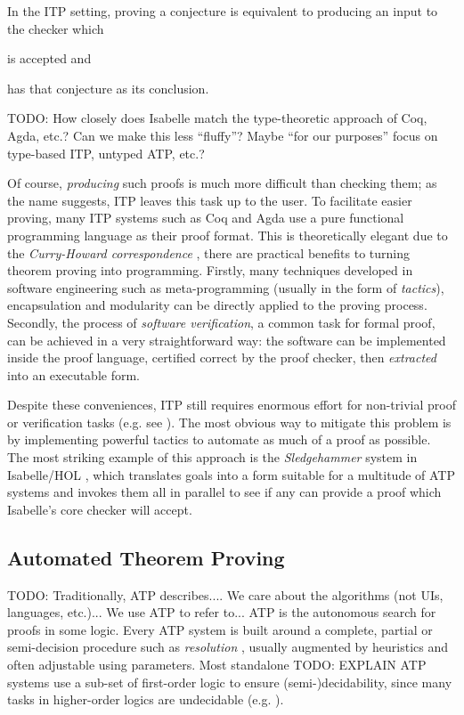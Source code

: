 \documentclass[]{article}
\begin{document}
In the ITP setting, proving a conjecture is equivalent to producing an input to the checker which \begin{inparaenum}[a)]
  \item is accepted and
  \item has that conjecture as its conclusion.
\end{inparaenum}

TODO: How closely does Isabelle match the type-theoretic approach of Coq, Agda, etc.? Can we make this less ``fluffy''?
      Maybe ``for our purposes'' focus on type-based ITP, untyped ATP, etc.?

Of course, \emph{producing} such proofs is much more difficult than checking them; as the name suggests, ITP leaves this task up to the user. To facilitate easier proving, many ITP systems such as Coq and Agda use a pure functional programming language as their proof format. This is theoretically elegant due to the \emph{Curry-Howard correspondence} \cite{wadler2015propositions}, there are practical benefits to turning theorem proving into programming. Firstly, many techniques developed in software engineering such as meta-programming (usually in the form of \emph{tactics}), encapsulation and modularity can be directly applied to the proving process. Secondly, the process of \emph{software verification}, a common task for formal proof, can be achieved in a very straightforward way: the software can be implemented inside the proof language, certified correct by the proof checker, then \emph{extracted} into an executable form.

Despite these conveniences, ITP still requires enormous effort for non-trivial proof or verification tasks (e.g. see \cite{hales2015formal}). The most obvious way to mitigate this problem is by implementing powerful tactics to automate as much of a proof as possible. The most striking example of this approach is the \emph{Sledgehammer} system in Isabelle/HOL \cite{journals/iandc/MengQP06}, which translates goals into a form suitable for a multitude of ATP systems and invokes them all in parallel to see if any can provide a proof which Isabelle's core checker will accept.

\subsection{Automated Theorem Proving}

TODO: Traditionally, ATP describes.... We care about the algorithms (not UIs, languages, etc.)... We use ATP to refer to...
ATP is the autonomous search for proofs in some logic. Every ATP system is built around a complete, partial or semi-decision procedure such as \emph{resolution} \cite[\S~9.6]{Russell:2003:AIM:773294}, usually augmented by heuristics and often adjustable using parameters. Most standalone TODO: EXPLAIN ATP systems use a sub-set of first-order logic \cite[\S~10]{Russell:2003:AIM:773294} to ensure (semi-)decidability, since many tasks in higher-order logics are undecidable (e.g. \cite{huet1973undecidability}).
\end{document}
